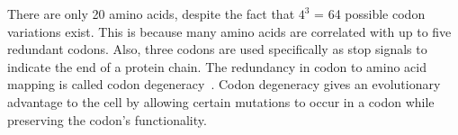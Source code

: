 \documentclass{bioinfo}
\begin{document}
There are only 20 amino acids, despite the fact that $4^3$ = 64 possible codon variations exist. This is because many amino acids are correlated with up to five redundant codons. Also, three codons are used specifically as stop signals to indicate the end of a protein chain. The redundancy in codon to amino acid mapping is called codon degeneracy~\cite{WBBGLL2008}. Codon degeneracy gives an evolutionary advantage to the cell by allowing certain mutations to occur in a codon while preserving the codon’s functionality.

\begin{table}[t]
	\caption{Codons}
	\label{fig:table1}
\end{table}
\end{document}
